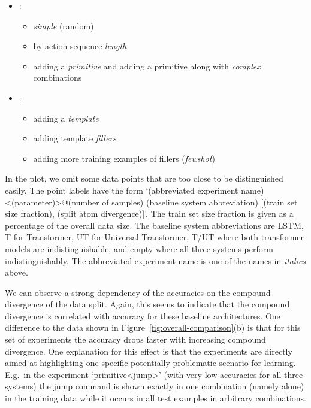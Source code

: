 \documentclass[letterpaper]{article}
\begin{document}
\begin{itemize}
    \item \citep{Lake2018GeneralizationWS}:
    \begin{itemize}
        \item \textit{simple} (random)
        \item by action sequence \textit{length}
        \item adding a \textit{primitive} and adding a primitive along with \textit{complex} combinations
    \end{itemize}
    \item \citep{rearranging}:
    \begin{itemize}
        \item adding a \textit{template}
        \item adding template \textit{fillers}
        \item adding more training examples  of fillers (\textit{fewshot})
    \end{itemize}
\end{itemize}
\vspace{1ex}

In the plot, we omit some data points that are too close to be distinguished easily. The point labels have the form `(abbreviated experiment name)<(parameter)>@(number of samples) (baseline system abbreviation) [(train set size fraction), (split atom divergence)]'. The train set size fraction is given as a percentage of the overall data size. The baseline system abbreviations are LSTM, T for Transformer, UT for Universal Transformer, T/UT where both transformer models are indistinguishable, and empty where all three systems perform indistinguishably. The abbreviated experiment name is one of the names in \textit{italics} above.

\vspace{1ex}
We can observe a strong dependency of the accuracies on the compound divergence of the data split. Again, this seems to indicate that the compound divergence is correlated with accuracy for these baseline architectures. 
One difference to the data shown in Figure~\ref{fig:overall-comparison}(b) is that for this set of experiments the accuracy drops faster with increasing compound divergence. One explanation for this effect is that the experiments are directly aimed at highlighting one specific potentially problematic scenario for learning. E.g.\ in the experiment `primitive<jump>' (with very low accuracies for all three systems) the jump command is shown exactly in one combination (namely alone) in the training data while it occurs in all test examples in arbitrary combinations.
\end{document}
